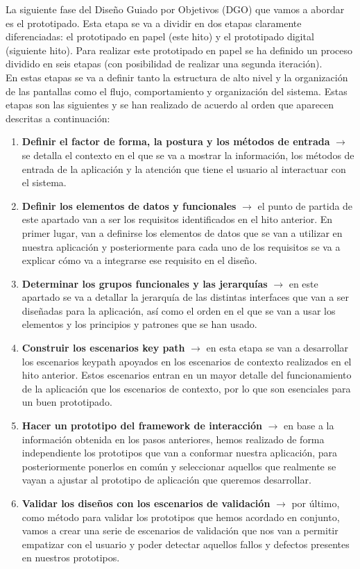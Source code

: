 
La siguiente fase del Diseño Guiado por Objetivos (DGO) que vamos a abordar es
el prototipado. Esta etapa se va a dividir en dos etapas claramente
diferenciadas: el prototipado en papel (este hito) y el prototipado digital
(siguiente hito). Para realizar este prototipado en papel se ha definido un
proceso dividido en seis etapas (con posibilidad de realizar una segunda
iteración). \\

En estas etapas se va a definir tanto la estructura de alto nivel y la
organización de las pantallas como el flujo, comportamiento y organización del
sistema. Estas etapas son las siguientes y se han realizado de acuerdo al orden
que aparecen descritas a continuación:
\begin{enumerate}
    \item \textbf{Definir el factor de forma, la postura y los métodos de entrada} $\rightarrow$ se detalla el contexto en el que se va a mostrar la información, los
    métodos de entrada de la aplicación y la atención que tiene el usuario al interactuar con el sistema.
    \item \textbf{Definir los elementos de datos y funcionales} $\rightarrow$ el punto de partida de este apartado van a ser los requisitos identificados en el hito anterior.
    En primer lugar, van a definirse los elementos de datos que se van a utilizar en nuestra aplicación y posteriormente para cada uno de los requisitos se va a explicar
    cómo va a integrarse ese requisito en el diseño.
    \item \textbf{Determinar los grupos funcionales y las jerarquías} $\rightarrow$ en este apartado se va a detallar la jerarquía de las distintas interfaces que van a 
    ser diseñadas para la aplicación, así como el orden en el que se van a usar los elementos y los principios y patrones que se han usado.
    \item \textbf{Construir los escenarios key path} $\rightarrow$ en esta etapa se van a desarrollar los escenarios keypath apoyados en los escenarios de contexto realizados
    en el hito anterior. Estos escenarios entran en un mayor detalle del funcionamiento de la aplicación que los escenarios de contexto, por lo que son esenciales para
    un buen prototipado.
    \item \textbf{Hacer un prototipo del framework de interacción} $\rightarrow$ en base a la información obtenida en los pasos anteriores, hemos realizado de forma independiente
    los prototipos que van a conformar nuestra aplicación, para posteriormente ponerlos en común y seleccionar aquellos que realmente se vayan a ajustar al prototipo de
    aplicación que queremos desarrollar.
    \item \textbf{Validar los diseños con los escenarios de validación} $\rightarrow$ por último, como método para validar los prototipos que hemos acordado en conjunto,
    vamos a crear una serie de escenarios de validación que nos van a permitir empatizar con el usuario y poder detectar aquellos fallos y defectos presentes en nuestros
    prototipos.
\end{enumerate}

